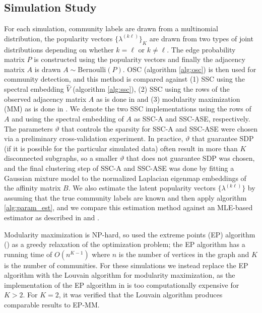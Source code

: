 \documentclass[
  11pt,
]{article}
\theoremstyle{definition}
\theoremstyle{definition}
\theoremstyle{definition}
\theoremstyle{definition}
\theoremstyle{remark}
\begin{document}
\hypertarget{simulation-study}{%
\subsection{Simulation Study}\label{simulation-study}}

For each simulation, community labels are drawn from a multinomial
distribution, the popularity vectors \(\{\lambda^{(k \ell)}\}_K\) are drawn
from two types of joint distributions depending on whether \(k = \ell\) or \(k \not = \ell\). The edge probability matrix \(P\) is constructed using the popularity
vectors and finally the adjacency matrix \(A\)
is drawn \(A \sim \mathrm{Bernoulli}(P)\). OSC (algorithm \ref{alg:osc}) is then used for community detection, and this
method is compared against (1) SSC using the spectral embedding \(\hat{V}\)
(algorithm \ref{alg:ssc}), (2) SSC using the rows of the
observed adjacency matrix \(A\) as is done in \citet{noroozi2019estimation}
and (3) modularity maximization (MM) as is done in
\citet{307cbeb9b1be48299388437423d94bf1}. We denote the two SSC
implementations using the rows of \(A\) and using the spectral embedding
of \(A\) as SSC-A and SSC-ASE, respectively.
The parameters \(\vartheta\)
that controls the sparsity for SSC-A and SSC-ASE were chosen via a preliminary cross-validation experiment.
In practice, \(\vartheta\) that guarantee SDP (if it is possible for the particular simulated data) often result in more than \(K\) disconnected subgraphs, so a smaller \(\vartheta\) that does not guarantee SDP was chosen,
and the final clustering step of SSC-A and SSC-ASE was done
by fitting a Gaussian mixture model to the normalized Laplacian
eigenmap embeddings \citep{belkin03:_laplac} of the affinity matrix \(B\).
We also estimate the latent popularity vectors \(\{\lambda^{(k \ell)}\}\)
by assuming that the true community labels are known and then apply
algorithm \ref{alg:param_est}, and we compare this estimation method against an
MLE-based estimator as described in \citet{noroozi2019estimation} and
\citet{307cbeb9b1be48299388437423d94bf1}.

Modularity maximization is NP-hard, so
\citet{307cbeb9b1be48299388437423d94bf1} used the extreme points
(EP) algorithm (\cite{le2016}) as a greedy
relaxation of the optimization problem; the EP algorithm has a running
time of \(O(n^{K-1})\) where \(n\) is the number of vertices in the graph
and \(K\) is the number of communities.
For these simulations we instead replace the EP algorithm with the
Louvain algorithm for modularity maximization,
as the implementation of the EP algorithm in
\citet{307cbeb9b1be48299388437423d94bf1} is too computationally expensive for \(K > 2\). For \(K = 2\), it
was verified that the Louvain algorithm produces comparable results
to EP-MM.
\end{document}
